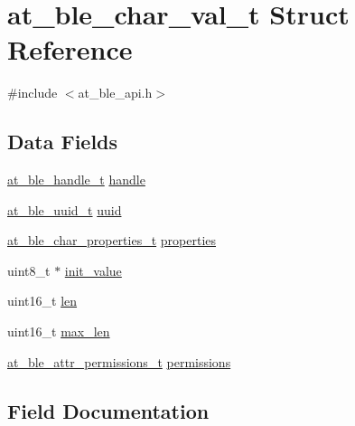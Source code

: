 \hypertarget{structat__ble__char__val__t}{}\section{at\+\_\+ble\+\_\+char\+\_\+val\+\_\+t Struct Reference}
\label{structat__ble__char__val__t}


{\ttfamily \#include $<$at\+\_\+ble\+\_\+api.\+h$>$}

\subsection*{Data Fields}
\begin{DoxyCompactItemize}
\item 
\mbox{\hyperlink{at__ble__api_8h_abd23646d0c662860741f787efc8456f2}{at\+\_\+ble\+\_\+handle\+\_\+t}} \mbox{\hyperlink{structat__ble__char__val__t_ab8b0f353cb6a8d85f0822900e3b7cf35}{handle}}
\item 
\mbox{\hyperlink{structat__ble__uuid__t}{at\+\_\+ble\+\_\+uuid\+\_\+t}} \mbox{\hyperlink{structat__ble__char__val__t_a679a8e56540040619aee07eb7a743859}{uuid}}
\item 
\mbox{\hyperlink{at__ble__api_8h_a5f124b442695fa38f139ebe48167698d}{at\+\_\+ble\+\_\+char\+\_\+properties\+\_\+t}} \mbox{\hyperlink{structat__ble__char__val__t_a0dafa6fd00ebd001cb8b6655e9806ed0}{properties}}
\item 
uint8\+\_\+t $\ast$ \mbox{\hyperlink{structat__ble__char__val__t_a6b60846854939357f47bec6cc755fc56}{init\+\_\+value}}
\item 
uint16\+\_\+t \mbox{\hyperlink{structat__ble__char__val__t_a8aed22e2c7b283705ec82e0120515618}{len}}
\item 
uint16\+\_\+t \mbox{\hyperlink{structat__ble__char__val__t_a1a6c02276292f164788906e8d5a316e5}{max\+\_\+len}}
\item 
\mbox{\hyperlink{at__ble__api_8h_a5d87cd231ea3f9e11846dba7cf75eb61}{at\+\_\+ble\+\_\+attr\+\_\+permissions\+\_\+t}} \mbox{\hyperlink{structat__ble__char__val__t_a546cd0fa9c3d1a1d7998330c034e6bc8}{permissions}}
\end{DoxyCompactItemize}


\subsection{Field Documentation}
\mbox{\label{structat__ble__char__val__t_ab8b0f353cb6a8d85f0822900e3b7cf35}} 
